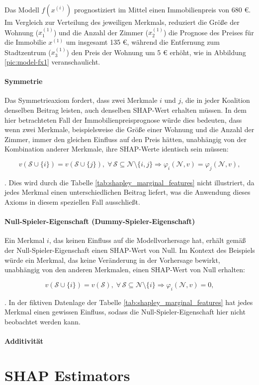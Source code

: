 Das Modell $f(x^{(i)})$
prognostiziert im Mittel einen Immobilienpreis von 680 \euro{}. Im Vergleich zur
Verteilung des jeweiligen Merkmals, reduziert die Größe der 
Wohnung ($x_1^{(1)}$) und die Anzahl der Zimmer ($x_2^{(1)}$) die Prognose 
des Preises für die Immobilie $x^{(1)}$ um insgesamt 135 \euro{}, während die Entfernung zum Stadtzentrum
($x_3^{(1)}$) den Preis der Wohnung um 5 \euro{} erhöht, wie in Abbildung 
\ref{pic:model-fx1} veranschaulicht.

\paragraph{Symmetrie}

Das Symmetrieaxiom fordert, dass zwei Merkmale $i$ und $j$, die 
in jeder Koalition denselben Beitrag leisten, auch denselben SHAP-Wert 
erhalten müssen. In dem hier betrachteten Fall der Immobilienpreisprognose 
würde dies bedeuten, dass wenn zwei Merkmale, beispielsweise die Größe einer 
Wohnung und die Anzahl der Zimmer, immer den gleichen Einfluss auf den Preis hätten, 
unabhängig von der Kombination anderer Merkmale, ihre SHAP-Werte identisch 
sein müssen:

\begin{equation}
    v(\mathcal{S} \cup \{i\}) = v(\mathcal{S} \cup \{j\}), \; \forall\, \mathcal{S} \subseteq \mathcal{N} \setminus \{i, j\} \Rightarrow \varphi_i (\mathcal{N}, v) = \varphi_j (\mathcal{N}, v),
\end{equation}

\cite[S. 221]{Molnar_2022}. Dies wird durch die Tabelle \ref{tab:shapley_marginal_features} 
nicht illustriert, da jedes Merkmal einen unterschiedlichen Beitrag liefert, 
was die Anwendung dieses Axioms in diesem speziellen Fall ausschließt.

\paragraph{Null-Spieler-Eigenschaft (Dummy-Spieler-Eigenschaft)}

Ein Merkmal $i$, das keinen Einfluss auf die Modellvorhersage hat, erhält gemäß der 
Null-Spieler-Eigenschaft einen SHAP-Wert von Null. 
Im Kontext des Beispiels würde ein Merkmal, das keine Veränderung in der Vorhersage 
bewirkt, unabhängig von den anderen Merkmalen, einen SHAP-Wert von Null erhalten:

\begin{equation}
    v(\mathcal{S} \cup \{i\}) =  v(\mathcal{S}), \; \forall\, \mathcal{S} \subseteq \mathcal{N} \setminus \{i\} \Rightarrow \varphi_i (\mathcal{N}, v) = 0,
\end{equation}

\cite[S. 222]{Molnar_2022}. In der fiktiven Datenlage der Tabelle \ref{tab:shapley_marginal_features} hat jedes Merkmal 
einen gewissen Einfluss, sodass die Null-Spieler-Eigenschaft hier nicht beobachtet werden kann.

\paragraph{Additivität}


\section{SHAP Estimators}
\label{sec:estimators}